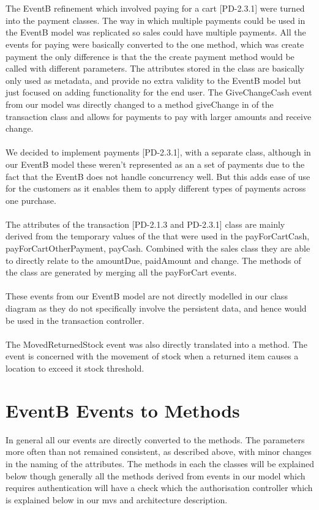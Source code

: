 \documentclass[a4paper]{article}
\begin{document}
\\\\
The EventB refinement which involved paying for a cart [PD-2.3.1] were turned into the payment classes. The way in which multiple payments could be used in the EventB model was replicated so sales could have multiple payments. All the events for paying were basically converted to the one method, which was create payment the only difference is that the the create payment method would be called with different parameters. The attributes stored in the class are basically only used as metadata, and provide no extra validity to the EventB model but just focused on adding functionality for the end user. The GiveChangeCash event from our model was directly changed to a method giveChange in of the transaction class and allows for payments to pay with larger amounts and receive change.
\\\\
We decided to implement payments [PD-2.3.1], with a separate class, although in our EventB model these weren't represented as an a set of payments due to the fact that the EventB does not handle concurrency well. But this adds ease of use for the customers as it enables them to apply different types of payments  across one purchase. 
\\\\
The attributes of the transaction [PD-2.1.3 and PD-2.3.1] class are mainly derived from the temporary values of the that were used in the payForCartCash, payForCartOtherPayment, payCash. Combined with the sales class they are able to directly relate to the amountDue, paidAmount and change. The methods of the class are generated by merging all the payForCart events.
\\\\
These events from our EventB model are not directly modelled in our class diagram as they do not specifically involve the persistent data, and hence would be used in the transaction controller. 
\\\\
The MovedReturnedStock event was also directly translated into a method. The event is concerned with the movement of stock when a returned item causes a location to exceed it stock threshold.
\pagebreak

\section{EventB Events to Methods}
In general all our events are directly converted to the methods. The parameters more often than not remained consistent, as described above, with minor changes in the naming of the attributes. The methods in each the classes will be explained below though generally all the methods derived from events in our model which requires authentication will have a check which the authorisation controller which is explained below in our mvs and architecture description.
\\\\
\end{document}
